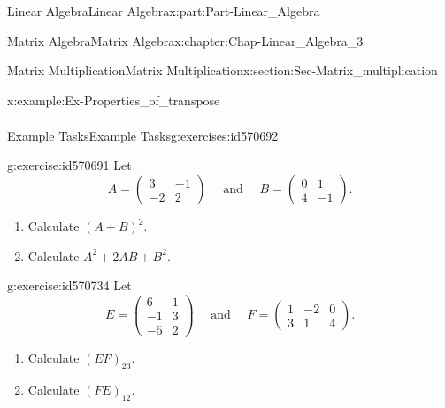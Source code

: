 \documentclass[oneside,10pt,]{book}
\numberwithin{equation}{section}
\newcommand{\amp}{&}
\begin{document}
\begin{partptx}{Linear Algebra}{}{Linear Algebra}{}{}{x:part:Part-Linear_Algebra}
\begin{chapterptx}{Matrix Algebra}{}{Matrix Algebra}{}{}{x:chapter:Chap-Linear_Algebra_3}
\begin{sectionptx}{Matrix Multiplication}{}{Matrix Multiplication}{}{}{x:section:Sec-Matrix_multiplication}
\begin{example}{}{x:example:Ex-Properties_of_transpose}
\begin{align*}
\end{align*}
%
\end{example}
%
%
\typeout{************************************************}
\typeout{************************************************}
%
\begin{exercises-subsection-numberless}{Example Tasks}{}{Example Tasks}{}{}{g:exercises:id570692}
\begin{divisionexercise}{1}{}{}{g:exercise:id570691}%
Let%
\begin{equation*}
A = \begin{pmatrix} 3 \amp -1 \\ -2 \amp 2\end{pmatrix} \quad \mbox{ and } \quad B=\begin{pmatrix} 0 \amp 1 \\ 4 \amp -1 \end{pmatrix}.
\end{equation*}
%
\begin{enumerate}[label=\alph*]
\item{}Calculate \((A+B)^2\).%
\item{}Calculate \(A^2 + 2AB + B^2\).%
\end{enumerate}
%
\end{divisionexercise}%
\begin{divisionexercise}{2}{}{}{g:exercise:id570734}%
Let%
\begin{equation*}
E = \begin{pmatrix} 6 \amp 1 \\ -1 \amp 3 \\ -5 \amp 2\end{pmatrix} \quad \mbox{ and } \quad F=\begin{pmatrix} 1 \amp -2 \amp 0 \\ 3 \amp 1 \amp 4 \end{pmatrix}.
\end{equation*}
%
\begin{enumerate}[label=\alph*]
\item{}Calculate \((EF)_{23}\).%
\item{}Calculate \((FE)_{12}\).%
\end{enumerate}
%
\end{divisionexercise}%
\end{exercises-subsection-numberless}
\end{sectionptx}
%
%
\typeout{************************************************}

\end{chapterptx}
\end{partptx}
\end{document}
